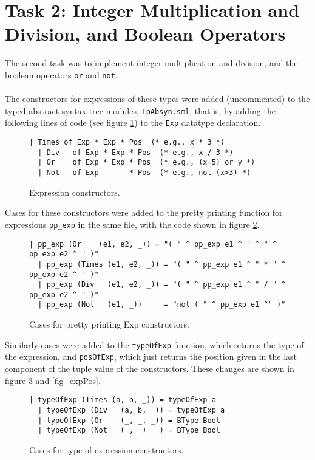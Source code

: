 \section{Task 2: Integer Multiplication and Division, and Boolean Operators}
The second task was to implement integer multiplication and division, and the
boolean operators \verb|or| and \verb|not|.\\
\\
The constructors for expressions of these types were added (uncommented) to the
typed abstract syntax tree modules, \verb|TpAbsyn.sml|, that is, by adding the
following lines of code (see figure \ref{fig_expConstructors}) to the \verb|Exp|
datatype declaration.
\begin{figure}[H]
  \begin{lstlisting}[style=MLStyle]
  | Times of Exp * Exp * Pos  (* e.g., x * 3 *)
  | Div   of Exp * Exp * Pos  (* e.g., x / 3 *)         
  | Or    of Exp * Exp * Pos  (* e.g., (x=5) or y *)
  | Not   of Exp       * Pos  (* e.g., not (x>3) *)      
  \end{lstlisting}
  \caption{Expression constructors.}
  \label{fig_expConstructors}
\end{figure}

\noindent
Cases for these constructors were added to the pretty printing function for
expressions \verb|pp_exp| in the same file, with the code shown in figure
\ref{fig_expPP}.
\begin{figure}[H]
  \begin{lstlisting}[style=MLStyle]
  | pp_exp (Or    (e1, e2, _)) = "( " ^ pp_exp e1 ^ " ^ " ^ pp_exp e2 ^ " )"
  | pp_exp (Times (e1, e2, _)) = "( " ^ pp_exp e1 ^ " * " ^ pp_exp e2 ^ " )"
  | pp_exp (Div   (e1, e2, _)) = "( " ^ pp_exp e1 ^ " / " ^ pp_exp e2 ^ " )"
  | pp_exp (Not   (e1, _))     = "not ( " ^ pp_exp e1 ^" )"
  \end{lstlisting}
  \caption{Cases for pretty printing Exp constructors.}
  \label{fig_expPP}
\end{figure}

\noindent
Similarly cases were added to the \verb|typeOfExp| function, which returns the
type of the expression, and \verb|posOfExp|, which just returns the position
given in the last component of the tuple value of the constructors. These
changes are shown in figure \ref{fig_expTyp} and \ref{fig_expPos}.
\begin{figure}[H]
  \begin{lstlisting}[style=MLStyle]
  | typeOfExp (Times (a, b, _)) = typeOfExp a
  | typeOfExp (Div   (a, b, _)) = typeOfExp a
  | typeOfExp (Or    (_, _, _)) = BType Bool
  | typeOfExp (Not   (_, _)   ) = BType Bool
  \end{lstlisting}
  \caption{Cases for type of expression constructors.}
  \label{fig_expTyp}
\end{figure}

